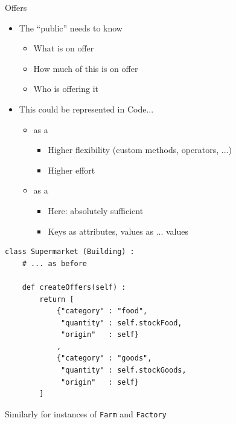 
\begin{frame}[fragile]{Offers}
%
\begin{itemize}
\item The \enquote{public} needs to know
	\begin{itemize}
	\item What is on offer
	\item How much of this is on offer
	\item Who is offering it
	\end{itemize}
\item This could be represented in Code...
	\begin{itemize}
	\item as a 
		\begin{itemize}
		\item Higher flexibility (custom methods, operators, ...)
		\item Higher effort
		\end{itemize}
	\item as a 
		\begin{itemize}
		\item Here: absolutely sufficient
		\item Keys as attributes, values as ... values
		\end{itemize}
	\end{itemize}
\end{itemize}
%
\end{frame}


\begin{frame}[fragile]
%
\begin{codebox}
\begin{verbatim}
class Supermarket (Building) :
    # ... as before
    
    def createOffers(self) :
        return [
            {"category" : "food",
             "quantity" : self.stockFood,
             "origin"   : self}
            ,
            {"category" : "goods",
             "quantity" : self.stockGoods,
             "origin"   : self}
        ]
\end{verbatim}
\end{codebox}
%
Similarly for instances of \texttt{Farm} and \texttt{Factory}
%
\end{frame}

